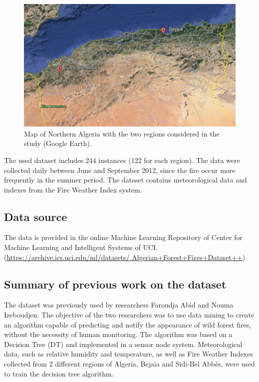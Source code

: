 \documentclass[10pt]{article}
\numberwithin{equation}{section}
\numberwithin{figure}{section}
\numberwithin{table}{section}
\begin{document}
\begin{figure}[H]
    \centering
    \includegraphics[scale=0.6]{Figures/Algeria_map.png}
    \caption{Map of Northern Algeria with the two regions considered in the study (Google Earth).}
    \label{fig:map}
\end{figure}


The used dataset includes 244 instances (122 for each region). The data were collected daily between June and September 2012, since the fire occur more frequently in the summer period. The dataset contains meteorological data and indexes from the Fire Weather Index system.


\subsection{Data source}
The data is provided in the online Machine Learning Repository of Center for Machine Learning and Intelligent Systems of UCI. (\url{https://archive.ics.uci.edu/ml/datasets/
Algerian+Forest+Fires+Dataset++})

\subsection{Summary of previous work on the dataset}
The dataset was previously used by researchers Faroudja Abid and Nouma Izeboudjen. The objective of the two researchers was to use data mining to create an algorithm capable of predicting and notify the appearance of wild forest fires, without the necessity of human monitoring. The algorithm was based on a Decision Tree (DT) and implemented in a sensor node system. Meteorological data, such as relative humidity and temperature, as well as Fire Weather Indexes collected from 2 different regions of Algeria, Bejaia and Sidi-Bel Abbès, were used to train the decision tree algorithm.\cite{article}
\end{document}
